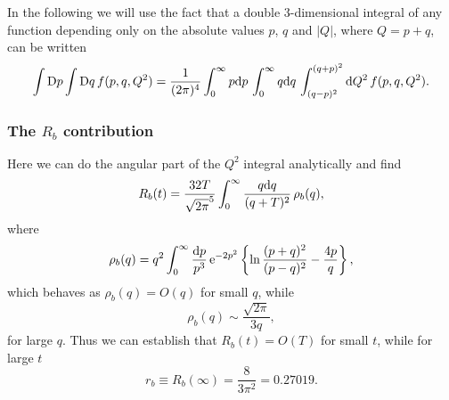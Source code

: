 \documentclass[preprint]{ptephy_v1}%
\newcommand{\rme}{{\rm e}}
\newcommand{\rmd}{{\rm d}}
\newcommand{\rmD}{{\rm D}}
\begin{document}
 In the following we will use the fact that a
double 3-dimensional integral of any function depending only on the absolute
values $p$, $q$ and $|Q|$, where $Q=p+q$, can be written
\begin{equation}
  \int \rmD p\int \rmD q \, f(p,q,Q^2)=\frac{1}{(2\pi)^4}\int_0^\infty p \rmd p\, \int_0^\infty
q\rmd q\, \int_{(q-p)^2}^{(q+p)^2}\rmd Q^2\, f(p,q,Q^2) .
\end{equation}

\subsubsection{The $R_b$ contribution}
Here we can do the angular part of the $Q^2$ integral analytically and find
\begin{equation}
R_b(t)=\frac{32T}{\sqrt{2\pi}^5}\int_0^\infty\frac{q\rmd q}{(q+T)^2}\, \rho_b(q),  
\end{equation}
where
\begin{equation}
\rho_b(q)=q^2\int_0^\infty\frac{\rmd p}{p^3}\, \rme^{-2p^2}\left\{
\ln\frac{(p+q)^2}{(p-q)^2}-\frac{4p}{q}\right\},
\end{equation}
which behaves as $\rho_b(q)= O(q) $ for small $q$, while
\begin{equation}
\rho_b(q)\sim \frac{\sqrt{2\pi}}{3q}, 
\end{equation}
for large $q$. 
Thus we can establish that $R_b(t)=O(T)$ for small $t$, while 
for large $t$
\begin{equation}
r_b\equiv  R_b(\infty)=\frac{8}{3\pi^2}=0.27019. 
\end{equation}
\end{document}
